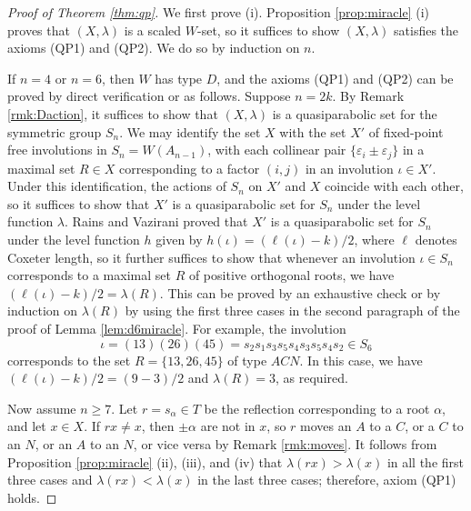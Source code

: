 \documentclass[11pt]{amsart}
\theoremstyle{plain}
\theoremstyle{definition}
\theoremstyle{remark}
\numberwithin{equation}{subsection}
\newcommand{\al}{\alpha}
\newcommand{\ep}{\varepsilon}
\begin{document}
\begin{proof}[Proof of Theorem \ref{thm:qp}]
We first prove (i). Proposition \ref{prop:miracle} (i) proves that $(X,
\lambda)$ is a scaled $W$-set, so it suffices to show $(X,\lambda)$ satisfies
the axioms (QP1) and (QP2). We do so by induction on $n$.

If $n=4$ or $n=6$, then $W$ has type $D$, and the axioms (QP1) and (QP2) can be
proved by direct verification or as follows. Suppose $n=2k$. By Remark
\ref{rmk:Daction}, it suffices to show that $(X,\lambda)$ is a quasiparabolic
set for the symmetric group $S_{n}$.  We may identify the set $X$ with the set
$X'$ of fixed-point free involutions in $S_{n}=W(A_{n-1})$, with each collinear
pair $\{\ep_i\pm\ep_j\}$ in a maximal set $R\in X$ corresponding to a factor
$(i,j)$ in an involution $\iota\in X'$. Under this identification, the actions
of $S_n$ on $X'$ and $X$ coincide with each other, so it suffices to show that
$X'$ is a quasiparabolic set for $S_n$ under the level function $\lambda$.
Rains and Vazirani \cite[Section 4]{rains13} proved that $X'$ is a
quasiparabolic set for $S_n$ under the level function $h$ given by
$h(\iota)=(\ell(\iota) - k)/2$, where $\ell$ denotes Coxeter length, so it
further suffices to show that whenever an involution $\iota \in S_n$ corresponds
to a maximal set $R$ of positive orthogonal roots, we have $(\ell(\iota) - k)/2
= \lambda(R)$. This can be proved by an exhaustive check or by induction on
$\lambda(R)$  by using the first three cases in the second paragraph of the
proof of Lemma \ref{lem:d6miracle}.  For example, the involution $$ \iota =
(13)(26)(45) = s_2 s_1 s_3 s_5 s_4 s_3 s_5 s_4 s_2 \in S_6 $$ corresponds to the
set $R=\{13,26,45\}$ of type $ACN$. In this case, we have $(\ell(\iota) - k)/2 =
(9-3)/2$ and $\lambda(R)=3$, as required.

Now assume $n\ge 7$. Let $r=s_\alpha \in T$ be the reflection corresponding to a
root $\al$, and let $x \in X$. If $rx \ne x$, then $\pm \al$ are not in $x$, so
$r$ moves an $A$ to a $C$, or a $C$ to an $N$, or an $A$ to an $N$, or vice
versa by Remark \ref{rmk:moves}. It follows from Proposition \ref{prop:miracle}
(ii), (iii), and (iv) that $\lambda(rx)> \lambda(x)$ in all the first three
cases and $\lambda(rx)<\lambda(x)$ in the last three cases; therefore, axiom (QP1)
holds.


\end{proof}
\end{document}
